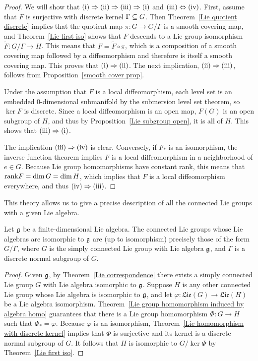 \begin{proof}
We will show that $(\rmnum{1})\Rightarrow(\rmnum{2})\Rightarrow(\rmnum{3})\Rightarrow(\rmnum{1})$ and $(\rmnum{3})\Leftrightarrow(\rmnum{4})$. First, assume that $F$ is surjective with discrete kernel $\Gamma\subseteq G$. Then Theorem~\ref{Lie quotient discrete} implies that the quotient map $\pi:G\to G/\Gamma$ is a smooth covering map, and Theorem~\ref{Lie first iso} shows that $F$ descends to a Lie group isomorphism $\widetilde{F}:G/\Gamma\to H$. This means
that $F=\widetilde{F}\circ\pi$, which is a composition of a smooth covering map followed by a diffeomorphism and therefore is itself a smooth covering map. This proves that $(\rmnum{1})\Rightarrow(\rmnum{2})$. The next implication, $(\rmnum{2})\Rightarrow(\rmnum{3})$, follows from Proposition~\ref{smooth cover prop}.\par
Under the assumption that $F$ is a local diffeomorphism, each level set is an embedded $0$-dimensional submanifold by the submersion level set theorem, so $\ker F$ is discrete. Since a local diffeomorphism is an open map, $F(G)$ is an open subgroup of $H$, and thus by Proposition~\ref{Lie subgroup open}, it is all of $H$. This shows that $(\rmnum{3})\Rightarrow(\rmnum{1})$.\par
The implication $(\rmnum{3})\Rightarrow(\rmnum{4})$ is clear. Conversely, if $F_*$ is an isomorphism, the inverse function theorem implies $F$ is a local diffeomorphism in a neighborhood of $e\in G$. Because Lie group homomorphisms have constant rank, this means that $\mathrm{rank} F=\dim G=\dim H$, which implies that $F$ is a local diffeomorphism everywhere, and thus $(\rmnum{4})\Rightarrow(\rmnum{3})$.
\end{proof}
This theory allows us to give a precise description of all the connected Lie groups with a given Lie algebra.
\begin{proposition}
Let $\mathfrak{g}$ be a finite-dimensional Lie algebra. The connected Lie groups whose Lie algebras are isomorphic to $\mathfrak{g}$ are (up to isomorphism) precisely those of the form $G/\Gamma$, where $G$ is the simply connected Lie group with Lie algebra $\mathfrak{g}$, and $\Gamma$ is a discrete normal subgroup of $G$.
\end{proposition}
\begin{proof}
Given $\mathfrak{g}$, by Theorem~\ref{Lie correspondence} there exists a simply connected Lie group $G$ with Lie algebra isomorphic to $\mathfrak{g}$. Suppose $H$ is any other connected Lie group whose Lie algebra is isomorphic to $\mathfrak{g}$, and let $\varphi:\mathfrak{Lie}(G)\to\mathfrak{Lie}(H)$ be a Lie algebra isomorphism. Theorem~\ref{Lie group homomorphism induced by algebra homo} guarantees that there is a Lie group homomorphism $\varPhi:G\to H$ such that $\varPhi_*=\varphi$. Because $\varphi$ is an isomorphism, Theorem~\ref{Lie homomorphism with discrete kernel} implies that $\varPhi$ is surjective and its kernel is a discrete normal subgroup of $G$. It follows that $H$ is isomorphic to $G/\ker\varPhi$ by Theorem~\ref{Lie first iso}.
\end{proof}
